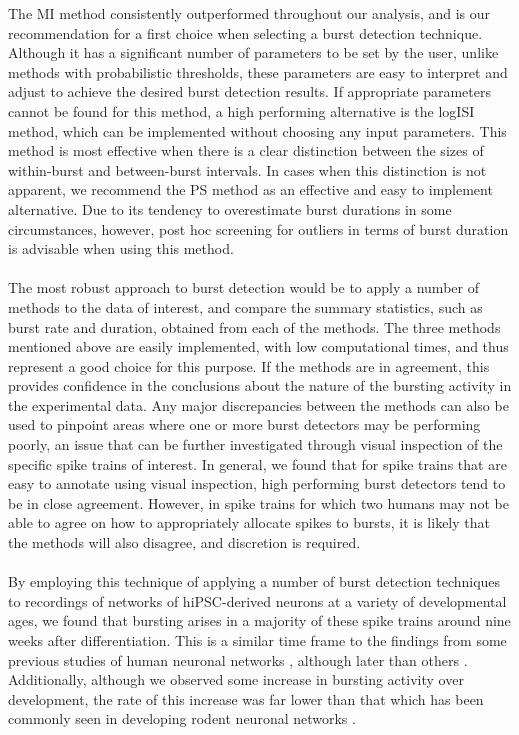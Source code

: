 \documentclass[12pt, titlepage]{article}
\begin{document}
	The MI method consistently outperformed throughout our analysis, and is our recommendation for a first choice when selecting a burst detection technique. Although it has a significant number of parameters to be set by the user, unlike methods with probabilistic thresholds, these parameters are easy to interpret and adjust to achieve the desired burst detection results. If appropriate parameters cannot be found for this method, a high performing alternative is the logISI method, which can be implemented without choosing any input parameters. This method is most effective when there is a clear distinction between the sizes of within-burst and between-burst intervals. 
	In cases when this distinction is not apparent, we recommend the PS method as an effective and easy to implement alternative. Due to its tendency to overestimate burst durations in some circumstances, however, post hoc screening for outliers in terms of burst duration is advisable when using this method.  
	\\ \\The most robust approach to burst detection would be to apply a number of methods to the data of interest, and compare the summary statistics, such as burst rate and duration, obtained from each of the methods. The three methods mentioned above are easily implemented, with low computational times, and thus represent a good choice for this purpose. If the methods are in agreement, this provides confidence in the conclusions about the nature of the bursting activity in the experimental data. Any major discrepancies between the methods can also be used to pinpoint areas where one or more burst detectors may be performing poorly, an issue that can be further investigated through visual inspection of the specific spike trains of interest. In general, we found that for spike trains that are easy to annotate using visual inspection, high performing burst detectors tend to be in close agreement. However, in spike trains for which two humans may not be able to agree on how to appropriately allocate spikes to bursts, it is likely that the methods will also disagree, and discretion is required.
	\\ \\By employing this technique of applying a number of burst detection techniques to recordings of networks of hiPSC-derived neurons at a variety of developmental ages, we found that bursting arises in a majority of these spike trains around nine weeks after differentiation.  This is a similar time frame to the findings from some previous studies of human neuronal networks \cite{Heikkila2009}, although later than others \cite{Illes2007}. Additionally, although we observed some increase in bursting activity over development, the rate of this increase was far lower than that which has been commonly seen in developing rodent neuronal networks \cite{Chiappalone2005,Charlesworth2015,Demas2003}.
\end{document}
